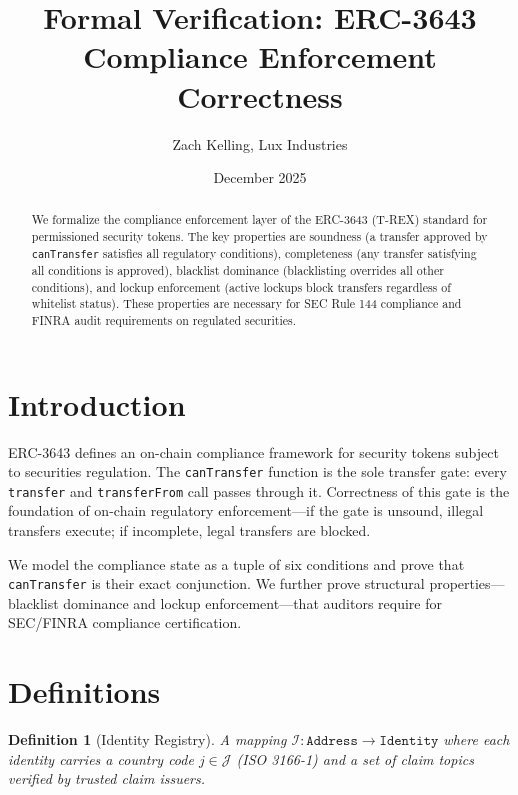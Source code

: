 \documentclass[11pt]{article}
\title{Formal Verification: ERC-3643 Compliance Enforcement Correctness}
\author{Zach Kelling, Lux Industries}
\date{December 2025}
\newtheorem{definition}[theorem]{Definition}
\begin{document}
\maketitle

\begin{abstract}
We formalize the compliance enforcement layer of the ERC-3643 (T-REX) standard for permissioned security tokens. The key properties are soundness (a transfer approved by \texttt{canTransfer} satisfies all regulatory conditions), completeness (any transfer satisfying all conditions is approved), blacklist dominance (blacklisting overrides all other conditions), and lockup enforcement (active lockups block transfers regardless of whitelist status). These properties are necessary for SEC Rule 144 compliance and FINRA audit requirements on regulated securities.
\end{abstract}

\section{Introduction}
ERC-3643 defines an on-chain compliance framework for security tokens subject to securities regulation. The \texttt{canTransfer} function is the sole transfer gate: every \texttt{transfer} and \texttt{transferFrom} call passes through it. Correctness of this gate is the foundation of on-chain regulatory enforcement---if the gate is unsound, illegal transfers execute; if incomplete, legal transfers are blocked.

We model the compliance state as a tuple of six conditions and prove that \texttt{canTransfer} is their exact conjunction. We further prove structural properties---blacklist dominance and lockup enforcement---that auditors require for SEC/FINRA compliance certification.

\section{Definitions}

\begin{definition}[Identity Registry]
A mapping $\mathcal{I} : \texttt{Address} \to \texttt{Identity}$ where each identity carries a country code $j \in \mathcal{J}$ (ISO 3166-1) and a set of claim topics verified by trusted claim issuers.
\end{definition}
\end{document}

